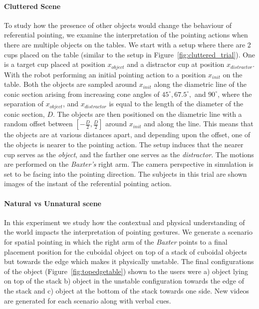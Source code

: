 \paragraph{Cluttered Scene}
To study how the presence of other objects would change the behaviour of referential pointing, we examine the interpretation of the pointing actions when there are multiple objects on the tables. We start with a setup where there are 2 cups placed on the table (similar to the setup in Figure~\ref{fig:cluttered_trial}). One is a target cup placed at position $x_{object}$ and a distractor cup at position $x_{distractor}$. With the robot performing an initial pointing action to a position $x_{init}$ on the table. Both the objects are sampled around $x_{init}$ along the diametric line of the conic section arising from increasing cone angles of $45^\circ, 67.5^\circ, $ and $90^\circ$, where the separation of $x_{object}$, and $x_{distractor}$ is equal to the length of the diameter of the conic section, $D$. The objects are then positioned on the diametric line with a random offset between $[-\frac{D}{2}, \frac{D}{2}]$ around $x_{init}$ and along the line. This means that the objects are at various distances apart, and depending upon the offset, one of the objects is nearer to the pointing action. The setup induces that the nearer cup serves as the \textit{object}, and the farther one serves as the \textit{distractor}. The motions are performed on the \textit{Baxter's} right arm. The camera perspective in simulation is set to be facing into the pointing direction. The subjects in this trial are shown images of the instant of the referential pointing action.




\paragraph{Natural vs Unnatural scene}
In this experiment we study how the contextual and physical understanding of the world impacts the interpretation of pointing gestures. We generate a scenario for spatial pointing in which the right arm of the \textit{Baxter} points to a final placement position for the cuboidal object on top of a stack of cuboidal objects but towards the edge which makes it physically unstable. The final configurations of the object (Figure~\ref{fig:topedgetable}) shown to the users were a) object lying on top of the stack b) object in the unstable configuration towards the edge of the stack and c) object at the bottom of the stack towards one side. New videos are generated for each scenario along with verbal cues.


